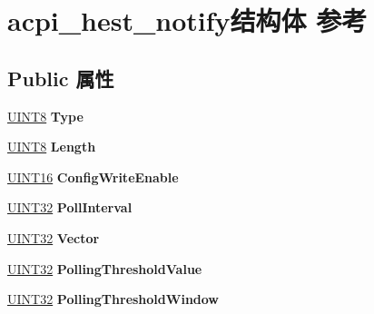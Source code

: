 \hypertarget{structacpi__hest__notify}{}\section{acpi\+\_\+hest\+\_\+notify结构体 参考}
\label{structacpi__hest__notify}
\subsection*{Public 属性}
\begin{DoxyCompactItemize}
\item 
\mbox{\label{structacpi__hest__notify_aea9b82cf5691dd3241e4eb103e76c653}} 
\hyperlink{_processor_bind_8h_ab27e9918b538ce9d8ca692479b375b6a}{U\+I\+N\+T8} {\bfseries Type}
\item 
\mbox{\label{structacpi__hest__notify_a5bae806733397a62ca8e1e85c464d729}} 
\hyperlink{_processor_bind_8h_ab27e9918b538ce9d8ca692479b375b6a}{U\+I\+N\+T8} {\bfseries Length}
\item 
\mbox{\label{structacpi__hest__notify_ab072ce2a29849a02352b0df382b2b96e}} 
\hyperlink{_processor_bind_8h_a09f1a1fb2293e33483cc8d44aefb1eb1}{U\+I\+N\+T16} {\bfseries Config\+Write\+Enable}
\item 
\mbox{\label{structacpi__hest__notify_a69c17359b82fd2f3915907a04658a033}} 
\hyperlink{_processor_bind_8h_ae1e6edbbc26d6fbc71a90190d0266018}{U\+I\+N\+T32} {\bfseries Poll\+Interval}
\item 
\mbox{\label{structacpi__hest__notify_a34d05898891c0badfcf4f5aa563b7890}} 
\hyperlink{_processor_bind_8h_ae1e6edbbc26d6fbc71a90190d0266018}{U\+I\+N\+T32} {\bfseries Vector}
\item 
\mbox{\label{structacpi__hest__notify_adf141e2e7431de322f06591a0cb3f291}} 
\hyperlink{_processor_bind_8h_ae1e6edbbc26d6fbc71a90190d0266018}{U\+I\+N\+T32} {\bfseries Polling\+Threshold\+Value}
\item 
\mbox{\label{structacpi__hest__notify_a4879de9787cbab9c8b37b8333d65d814}} 
\hyperlink{_processor_bind_8h_ae1e6edbbc26d6fbc71a90190d0266018}{U\+I\+N\+T32} {\bfseries Polling\+Threshold\+Window}

\end{DoxyCompactItemize}
